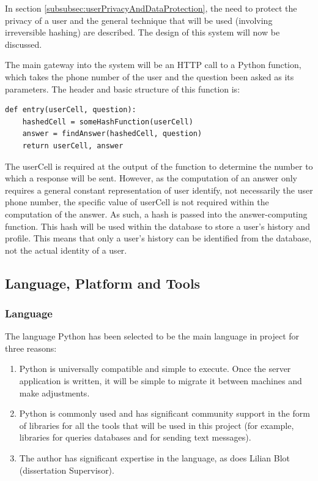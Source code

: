 \documentclass{article}
\begin{document}
In section \ref{subsubsec:userPrivacyAndDataProtection}, the need to protect the privacy of a user and the general technique that will be used (involving irreversible hashing) are described.  The design of this system will now be discussed.

The main gateway into the system will be an HTTP call to a Python function, which takes the phone number of the user and the question been asked as its parameters.  The header and basic structure of this function is:

\begin{lstlisting}
def entry(userCell, question):
    hashedCell = someHashFunction(userCell)
    answer = findAnswer(hashedCell, question)
    return userCell, answer
\end{lstlisting}

The userCell is required at the output of the function to determine the number to which a response will be sent.  However, as the computation of an answer only requires a general constant representation of user identify, not necessarily the user phone number, the specific value of userCell is not required within the computation of the answer.  As such, a hash is passed into the answer-computing function.  This hash will be used within the database to store a user's history and profile.  This means that only a user's history can be identified from the database, not the actual identity of a user.

\subsection{Language, Platform and Tools}
\subsubsection{Language}
The language Python has been selected to be the main language in project for three reasons:
\begin{enumerate}
  \item Python is universally compatible and simple to execute.  Once the server application is written, it will be simple to migrate it between machines and make adjustments.
  \item Python is commonly used and has significant community support in the form of libraries for all the tools that will be used in this project (for example, libraries for queries databases and for sending text messages).
  \item The author has significant expertise in the language, as does Lilian Blot (dissertation Supervisor).
\end{enumerate}
\end{document}
